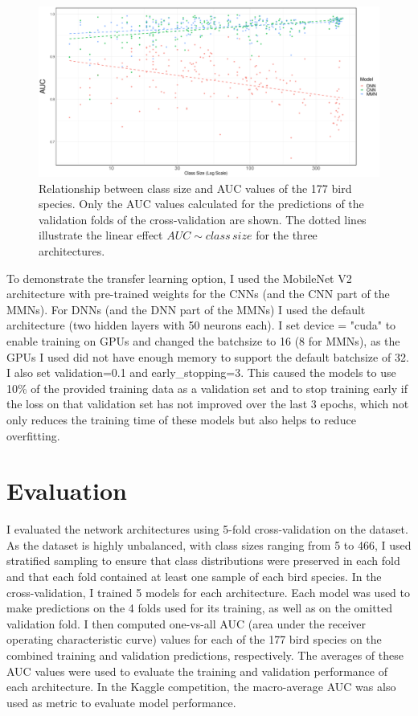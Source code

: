 \documentclass[12pt,twoside]{scrreport}
\begin{document}
\begin{figure}[ht]
	\includegraphics[width=\textwidth]{../analysis/results/figures/auc_classSize.pdf}
	\caption{Relationship between class size and AUC values of the 177 bird species. Only the AUC values calculated for the predictions of the validation folds of the cross-validation are shown. The dotted lines illustrate the linear effect $AUC \sim class\,size$ for the three architectures.}
	\label{classSize}
\end{figure}

To demonstrate the transfer learning option, I used the MobileNet V2 \citep{sandlerMobileNetV2InvertedResiduals2019} architecture with pre-trained weights for the CNNs (and the CNN part of the MMNs). For DNNs (and the DNN part of the MMNs) I used the default architecture (two hidden layers with 50 neurons each). I set device = "cuda" to enable training on GPUs and changed the batchsize to 16 (8 for MMNs), as the GPUs I used did not have enough memory to support the default batchsize of 32. I also set validation=0.1 and early\_stopping=3. This caused the models to use 10\% of the provided training data as a validation set and to stop training early if the loss on that validation set has not improved over the last 3 epochs, which not only reduces the training time of these models but also helps to reduce overfitting.

\section*{Evaluation}
I evaluated the network architectures using 5-fold cross-validation on the dataset. As the dataset is highly unbalanced, with class sizes ranging from 5 to 466, I used stratified sampling to ensure that class distributions were preserved in each fold and that each fold contained at least one sample of each bird species. In the cross-validation, I trained 5 models for each architecture. Each model was used to make predictions on the 4 folds used for its training, as well as on the omitted validation fold. I then computed one-vs-all AUC (area under the receiver operating characteristic curve) values for each of the 177 bird species on the combined training and validation predictions, respectively. The averages of these AUC values were used to evaluate the training and validation performance of each architecture. In the Kaggle competition, the macro-average AUC was also used as metric to evaluate model performance.
\end{document}
